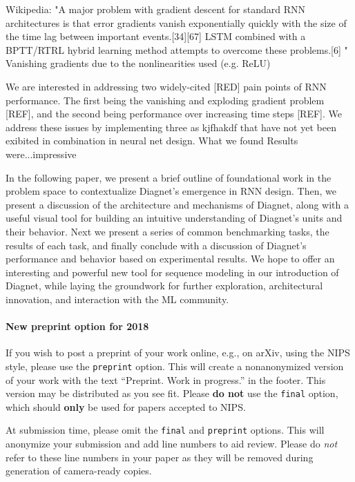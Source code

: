 \documentclass{article}
\begin{document}
 
Wikipedia: "A major problem with gradient descent for standard RNN architectures is that error gradients vanish exponentially quickly with the size of the time lag between important events.[34][67] LSTM combined with a BPTT/RTRL hybrid learning method attempts to overcome these problems.[6] "
Vanishing gradients due to the nonlinearities used (e.g. ReLU)
      
We are interested in addressing two widely-cited [RED] pain points of RNN performance.  The first being the vanishing and exploding gradient problem [REF], and the second being performance over increasing time steps [REF].  We address these issues by implementing three as kjfhakdf that have not yet been exibited in combination in neural net design. 
What we found Results were...impressive

In the following paper, we present a brief outline of foundational work in the problem space to contextualize Diagnet’s emergence in RNN design.  Then, we present a discussion of the architecture and mechanisms of Diagnet, along with a useful visual tool for building an intuitive understanding of Diagnet’s units and their behavior.  Next we present a series of common benchmarking tasks, the results of each task, and finally conclude with a discussion of Diagnet’s performance and behavior based on experimental results.  We hope to offer an interesting and powerful new tool for sequence modeling in our introduction of Diagnet, while laying the groundwork for further exploration, architectural innovation, and interaction with the ML community.

\paragraph{New preprint option for 2018}
If you wish to post a preprint of your work online, e.g., on arXiv,
using the NIPS style, please use the \verb+preprint+ option. This will
create a nonanonymized version of your work with the text
``Preprint. Work in progress.''  in the footer. This version may be
distributed as you see fit. Please \textbf{do not} use the
\verb+final+ option, which should \textbf{only} be used for papers
accepted to NIPS.

At submission time, please omit the \verb+final+ and \verb+preprint+
options. This will anonymize your submission and add line numbers to aid
review. Please do \emph{not} refer to these line numbers in your paper
as they will be removed during generation of camera-ready copies.
\end{document}
